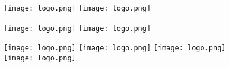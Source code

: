 \documentclass{article}
\begin{document}
\begin{figure}[h]
\texttt{[image: logo.png]}
\texttt{[image: logo.png]}


\texttt{[image: logo.png]}
\texttt{[image: logo.png]}


\texttt{[image: logo.png]}
\texttt{[image: logo.png]}
\texttt{[image: logo.png]}
\texttt{[image: logo.png]}

\end{figure}
\end{document}
